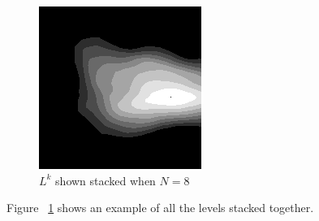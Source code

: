\begin{figure}[htb]
  \begin{center}
    \includegraphics[width=0.9\linewidth]{ch-methodology/figures/hcastack}
    \caption[$L^k$ shown stacked when $N=8$]{$L^k$ shown stacked when $N=8$}
    \label{fig:methodology:hcastack}
  \end{center}
\end{figure}

Figure ~\ref{fig:methodology:hcastack} shows an example of all the levels stacked together.

